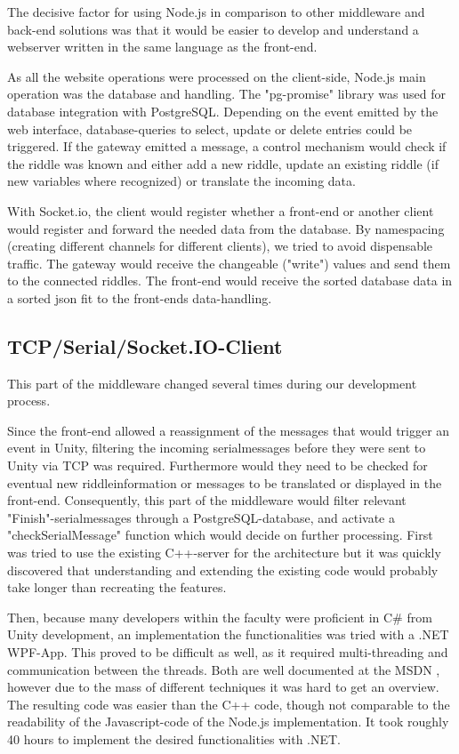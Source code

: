 The decisive factor for using Node.js in comparison to other middleware and back-end solutions was that it would be easier to develop and understand a webserver written in the same language as the front-end.

As all the website operations were processed on the client-side, Node.js main operation was the database and handling.
The "pg-promise" library \parencite{pg-promise} was used for database integration with PostgreSQL.
Depending on the event emitted by the web interface, database-queries to select, update or delete entries could be triggered.
If the gateway emitted a message, a control mechanism would check if the riddle was known and either add a new riddle, update an existing riddle (if new variables where recognized) or translate the incoming data.

With Socket.io, the client would register whether a front-end or another client would register and forward the needed data from the database.
By namespacing (creating different channels for different clients), we tried to avoid dispensable traffic.
The gateway would receive the changeable ("write") values and send them to the connected riddles.
The front-end would receive the sorted database data in a sorted json fit to the front-ends data-handling.

\subsection{TCP/Serial/Socket.IO-Client}
This part of the middleware changed several times during our development process.

Since the front-end allowed a reassignment of the messages that would trigger an event in Unity, 
filtering the incoming serialmessages before they were sent to Unity via TCP was required.
Furthermore would they need to be checked for eventual new riddleinformation or messages to be translated or displayed in the front-end.
Consequently, this part of the middleware would filter relevant "Finish"-serialmessages through a PostgreSQL-database, 
and activate a "checkSerialMessage" function which would decide on further processing.
First was tried to use the existing C++-server for the architecture but it was quickly discovered that understanding and extending the existing code would probably take longer than recreating the features.

Then, because many developers within the faculty were proficient in C\# from Unity development, an implementation the functionalities was tried with a .NET WPF-App.
This proved to be difficult as well, as it required multi-threading and communication between the threads. 
Both are well documented at the MSDN \parencite{MSDN},
however due to the mass of different techniques it was hard to get an overview.
The resulting code was easier than the C++ code, though not comparable to the readability of the Javascript-code of the Node.js implementation.
It took roughly 40 hours to implement the desired functionalities with .NET.

